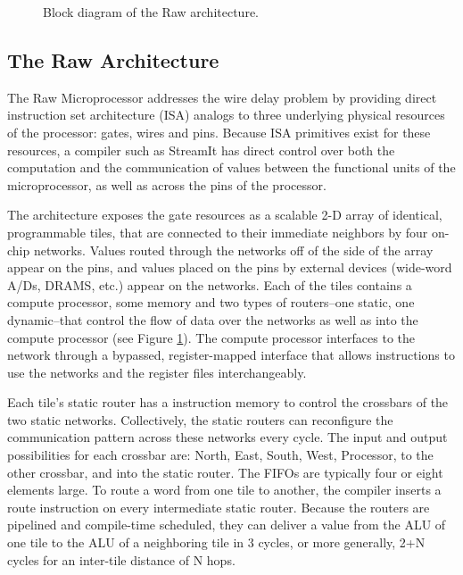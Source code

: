 
\begin{figure}
\centering
{}
\caption{Block diagram of the Raw architecture.
\protect\label{fig:raw-diagram}}
\end{figure}

\subsection{The Raw Architecture}
\label{sec:raw}

The Raw Microprocessor \cite{raw10,raw} addresses the wire delay
problem \cite{raw13} by providing direct instruction set architecture
(ISA) analogs to three underlying physical resources of the processor:
gates, wires and pins. Because ISA primitives exist for these
resources, a compiler such as StreamIt has direct control over both
the computation and the communication of values between the functional
units of the microprocessor, as well as across the pins of the
processor.

The architecture exposes the gate resources as a scalable 2-D array of
identical, programmable tiles, that are connected to their immediate
neighbors by four on-chip networks.  Values routed through the
networks off of the side of the array appear on the pins, and values
placed on the pins by external devices (wide-word A/Ds, DRAMS, etc.)
appear on the networks.  Each of the tiles contains a compute
processor, some memory and two types of routers--one static, one
dynamic--that control the flow of data over the networks as well as
into the compute processor (see Figure \ref{fig:raw-diagram}).  The
compute processor interfaces to the network through a bypassed,
register-mapped interface \cite{raw10} that allows instructions to use
the networks and the register files interchangeably.

Each tile's static router has a instruction memory to control the
crossbars of the two static networks. Collectively, the static routers
can reconfigure the communication pattern across these networks every
cycle.  The input and output possibilities for each crossbar are:
North, East, South, West, Processor, to the other crossbar, and into
the static router. The FIFOs are typically four or eight elements
large.  To route a word from one tile to another, the compiler inserts
a route instruction on every intermediate static router.  Because the
routers are pipelined and compile-time scheduled, they can deliver a
value from the ALU of one tile to the ALU of a neighboring tile in 3
cycles, or more generally, 2+N cycles for an inter-tile distance of N
hops.

